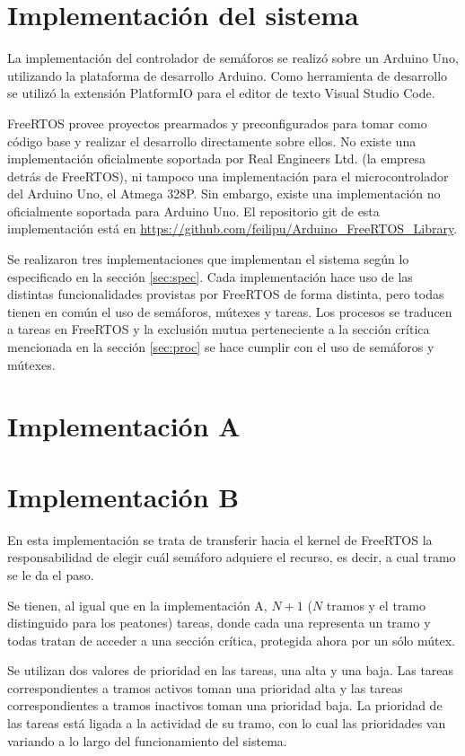 \section{Implementación del sistema}
La implementación del controlador de semáforos se realizó sobre un Arduino Uno, utilizando la plataforma de desarrollo Arduino. Como herramienta de desarrollo se utilizó la extensión PlatformIO para el editor de texto Visual Studio Code.

FreeRTOS provee proyectos prearmados y preconfigurados para tomar como código base y realizar el desarrollo directamente sobre ellos. No existe una implementación oficialmente soportada por Real Engineers Ltd. (la empresa detrás de FreeRTOS), ni tampoco una implementación para el microcontrolador del Arduino Uno, el Atmega 328P. Sin embargo, existe una implementación no oficialmente soportada para Arduino Uno. El repositorio git de esta implementación está en \url{https://github.com/feilipu/Arduino\_FreeRTOS\_Library}.

Se realizaron tres implementaciones que implementan el sistema según lo especificado en la sección \ref{sec:spec}. Cada implementación hace uso de las distintas funcionalidades provistas por FreeRTOS de forma distinta, pero todas tienen en común el uso de semáforos, mútexes y tareas. Los procesos se traducen a tareas en FreeRTOS y la exclusión mutua perteneciente a la sección crítica mencionada en la sección \ref{sec:proc} se hace cumplir con el uso de semáforos y mútexes.

\section{Implementación A}
\section{Implementación B}
En esta implementación se trata de transferir hacia el kernel de FreeRTOS la responsabilidad de elegir cuál semáforo adquiere el recurso, es decir, a cual tramo se le da el paso.

Se tienen, al igual que en la implementación A, $N + 1$ ($N$ tramos y el tramo distinguido para los peatones) tareas, donde cada una representa un tramo y todas tratan de acceder a una sección crítica, protegida ahora por un sólo mútex.

Se utilizan dos valores de prioridad en las tareas, una alta y una baja. Las tareas correspondientes a tramos activos toman una prioridad alta y las tareas correspondientes a tramos inactivos toman una prioridad baja. La prioridad de las tareas está ligada a la actividad de su tramo, con lo cual las prioridades van variando a lo largo del funcionamiento del sistema.

